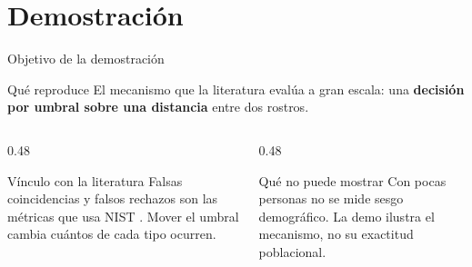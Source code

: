 \section{Demostraci\'on}

\begin{frame}{Objetivo de la demostraci\'on}

  \begin{block}{Qu\'e reproduce}
    El mecanismo que la literatura eval\'ua a gran escala: una
    \textbf{decisi\'on por umbral sobre una distancia} entre dos rostros.
  \end{block}

  \begin{columns}[T]
    \begin{column}{0.48\textwidth}
      \begin{exampleblock}{V\'inculo con la literatura}
        \scriptsize
        Falsas coincidencias y falsos rechazos son las m\'etricas que usa
        NIST \cite{grother_nistir8280_2019}. Mover el umbral cambia
        cu\'antos de cada tipo ocurren.
      \end{exampleblock}
    \end{column}
    \begin{column}{0.48\textwidth}
      \begin{alertblock}{Qu\'e no puede mostrar}
        \scriptsize
        Con pocas personas no se mide sesgo demogr\'afico. La demo ilustra
        el mecanismo, no su exactitud poblacional.
      \end{alertblock}
    \end{column}
  \end{columns}
\end{frame}

